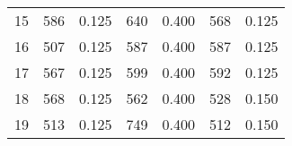 \begin{longtable}{cp{2cm}p{2cm}p{2cm}p{2cm}p{2cm}p{2cm}}
15 &       586 &                 0.125 &     640 &               0.400 &      568 &                0.125 \\
16 &       507 &                 0.125 &     587 &               0.400 &      587 &                0.125 \\
17 &       567 &                 0.125 &     599 &               0.400 &      592 &                0.125 \\
18 &       568 &                 0.125 &     562 &               0.400 &      528 &                0.150 \\
19 &       513 &                 0.125 &     749 &               0.400 &      512 &                0.150 \\
\end{longtable}

